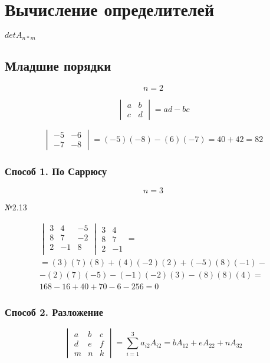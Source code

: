 \documentclass{article}
\begin{document}
\section{Вычисление определителей}

$detA_{n*m}$

\subsection{Младшие порядки}
\[
n = 2
\]

\[
\begin{vmatrix}
	a & b \\
	c & d
\end{vmatrix}
= ad - bc
\]

\[
\begin{vmatrix}
	-5 & -6 \\
	-7 & -8
\end{vmatrix}
= (-5)(-8) - (6)(-7) = 40 + 42 = 82
\]

\subsubsection{Способ 1. По Саррюсу}
\[
n = 3
\]

№2.13

\begin{gather*}
\begin{vmatrix}
	3 & 4 & -5 \\
	8 & 7 & -2 \\
	2 & -1 & 8 \\	
\end{vmatrix}
\begin{matrix}
	3 & 4 \\
	8 & 7 \\
	2 & -1
\end{matrix} = \\
= (3)(7)(8) + (4)(-2)(2) + (-5)(8)(-1) - \\
- (2)(7)(-5) - (-1)(-2)(3) - (8)(8)(4) = \\
168 - 16 + 40 + 70 - 6 - 256 = 0
\end{gather*}

\subsubsection{Способ 2. Разложение}

\[
\begin{vmatrix}
	a & b & c \\
	d & e & f \\
	m & n & k	
\end{vmatrix} =
\sum_{i=1}^{3} a_{i2} A_{i2} =
bA_{12} + eA_{22} + nA_{32}
\]
\end{document}
